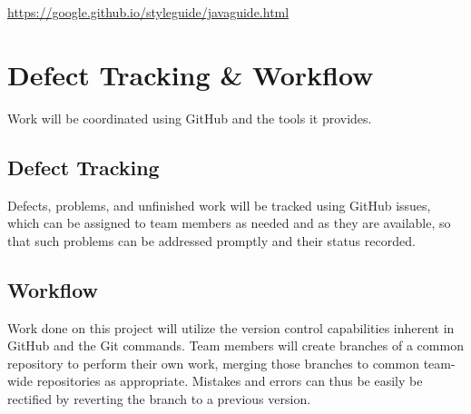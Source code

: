 \documentclass{scrreprt}
\begin{document}
\url{https://google.github.io/styleguide/javaguide.html}

\section{Defect Tracking \& Workflow}
Work will be coordinated using GitHub and the tools it provides.

\subsection{Defect Tracking}
Defects, problems, and unfinished work will be tracked using GitHub issues, which can be assigned to team members as needed and as they are available, so that such problems can be addressed promptly and their status recorded.

\subsection{Workflow}
Work done on this project will utilize the version control capabilities inherent in GitHub and the Git commands.  Team members will create branches of a common repository to perform their own work, merging those branches to common team-wide repositories as appropriate.  Mistakes and errors can thus be easily be rectified by reverting the branch to a previous version.
\end{document}
